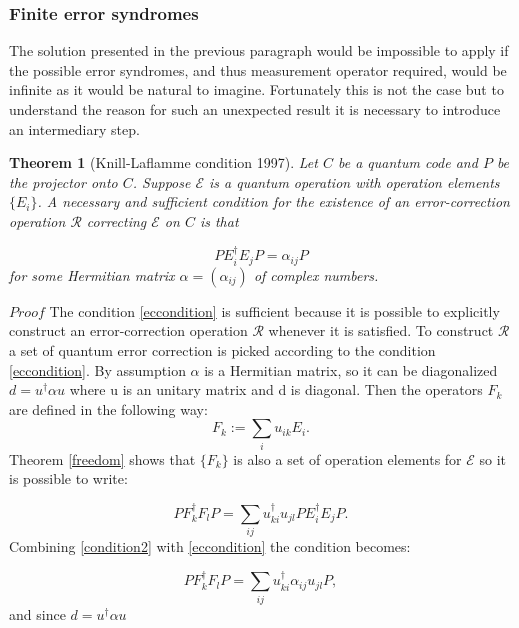 \documentclass{article}
\newtheorem{theorem}{Theorem}
\begin{document}
\subsubsection{Finite error syndromes}

The solution presented in the previous paragraph would be impossible to
apply if the possible error syndromes, and thus measurement operator required, would be
infinite as it would be natural to imagine.
Fortunately this is not the case but to understand the reason for such
an unexpected result it is necessary to introduce an intermediary step.

\begin{theorem}[Knill-Laflamme condition 1997]
	\label{conditions}
	Let $C$ be a quantum code and $P$ be the projector onto $C$.
	Suppose $\mathcal{E}$ is a quantum operation with operation elements $\{E_i\}$.
	A necessary and sufficient condition for the existence of an error-correction
	operation $\mathcal{R}$ correcting $\mathcal{E}$ on $C$ is that

	\begin{equation}
		P E_i^\dagger E_j P = \alpha_{ij} P
		\label{eccondition}
	\end{equation}
	for some Hermitian matrix $\alpha = (\alpha_{ij})$ of complex numbers.
\end{theorem}


\noindent $Proof$ \hspace{10pt}
The condition \ref{eccondition} is sufficient because it
is possible to explicitly construct an error-correction operation
$\mathcal{R}$ whenever it is satisfied.
To construct $\mathcal{R}$ a set of quantum error correction is picked
according to the condition \ref{eccondition}.
By assumption $\alpha$ is a Hermitian matrix, so it can be diagonalized
$d =u^\dagger \alpha u$ where u is an unitary matrix and d is diagonal.
Then the operators $F_k$ are defined in the following way:
\begin{equation}
	F_k := \sum_i u_{ik} E_i.
\end{equation}
Theorem \ref{freedom} shows that $\{F_k\}$ is also a set of operation
elements for $\mathcal{E}$ so it is possible to write:

\begin{equation}
	\label{condition2}
	P F_k^\dagger F_l P = \sum_{ij} u_{ki}^\dagger u_{jl} P E_{i}^\dagger E_j P.
\end{equation}
Combining \ref{condition2} with \ref{eccondition}
the condition becomes:

\begin{equation}
	P F_k^\dagger F_l P = \sum_{ij} u_{ki}^\dagger \alpha_{ij} u_{jl} P,
\end{equation}
and since $d = u^\dagger \alpha u$
\end{document}

